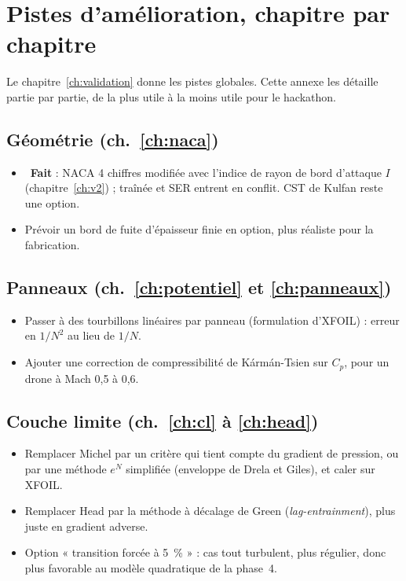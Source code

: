 \chapter{Pistes d'amélioration, chapitre par chapitre}\label{annexe:pistes}

Le chapitre~\ref{ch:validation} donne les pistes globales. Cette annexe les détaille partie par partie, de la plus utile à la moins utile pour le hackathon.

\section*{Géométrie (ch.~\ref{ch:naca})}
\begin{itemize}
\item {}~\textbf{Fait} : NACA 4 chiffres modifiée avec l'indice de rayon de bord d'attaque $I$ (chapitre~\ref{ch:v2}) ; traînée et SER entrent en conflit. CST de Kulfan reste une option.
\item Prévoir un bord de fuite d'épaisseur finie en option, plus réaliste pour la fabrication.
\end{itemize}

\section*{Panneaux (ch.~\ref{ch:potentiel} et \ref{ch:panneaux})}
\begin{itemize}
\item Passer à des tourbillons linéaires par panneau (formulation d'XFOIL) : erreur en $1/N^2$ au lieu de $1/N$.
\item Ajouter une correction de compressibilité de Kármán-Tsien sur $C_p$, pour un drone à Mach 0,5 à 0,6.
\end{itemize}

\section*{Couche limite (ch.~\ref{ch:cl} à \ref{ch:head})}
\begin{itemize}
\item Remplacer Michel par un critère qui tient compte du gradient de pression, ou par une méthode $e^N$ simplifiée (enveloppe de Drela et Giles), et caler sur XFOIL.
\item Remplacer Head par la méthode à décalage de Green (\emph{lag-entrainment}), plus juste en gradient adverse.
\item Option « transition forcée à 5~\% » : cas tout turbulent, plus régulier, donc plus favorable au modèle quadratique de la phase~4.
\end{itemize}

